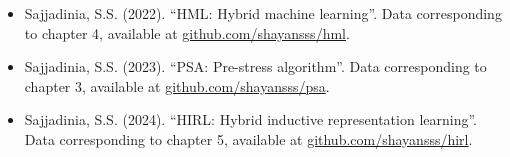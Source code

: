 \documentclass[12pt,a4paper]{report}
\begin{document}
\begin{itemize}
\begin{itemize}
    \item Sajjadinia, S.S. (2022). “HML: Hybrid machine learning”. Data corresponding to chapter 4, available at \href{https://github.com/shayansss/hml}{github.com/shayansss/hml}.
    \item Sajjadinia, S.S. (2023). “PSA: Pre-stress algorithm”. Data corresponding to chapter 3, available at \href{https://github.com/shayansss/psa}{github.com/shayansss/psa}.
    \item Sajjadinia, S.S. (2024). “HIRL: Hybrid inductive representation learning”. Data corresponding to chapter 5, available at \href{https://github.com/shayansss/hirl}{github.com/shayansss/hirl}.
\end{itemize}
\end{itemize}

\clearpage

\tableofcontents
\newpage

\listoffigures{}
\newpage

\listoftables{}
\newpage
\end{document}
